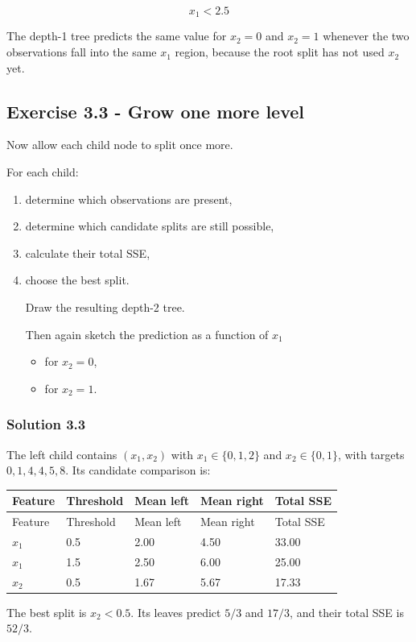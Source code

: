 \documentclass[10pt]{article}
\begin{document}
\[
x_1<2.5
\]

The depth-1 tree predicts the same value for $x_2=0$ and $x_2=1$
whenever the two observations fall into the same $x_1$ region, because
the root split has not used $x_2$ yet.

\par\endgroup

\subsection*{Exercise 3.3 - Grow one more level}
Now allow each child node to split once more.

For each child:

\begin{enumerate}
\item
determine which observations are present,

\item
determine which candidate splits are still possible,

\item
calculate their total SSE,

\item
choose the best split.

Draw the resulting depth-2 tree.

Then again sketch the prediction as a function of $x_1$

\begin{itemize}
\item
for $x_2=0$,

\item
for $x_2=1$.

\end{itemize}
\end{enumerate}
\begingroup\color{red}

\subsubsection*{Solution 3.3}
The left child contains $(x_1,x_2)$ with $x_1\in\{0,1,2\}$ and
$x_2\in\{0,1\}$, with targets $0,1,4,4,5,8$. Its candidate comparison
is:

\begingroup
\small
\setlength{\tabcolsep}{4pt}
\begin{longtable}{l|l|l|l|l}
Feature & Threshold & Mean left & Mean right & Total SSE \\
\hline
\endfirsthead
Feature & Threshold & Mean left & Mean right & Total SSE \\
\hline
\endhead
$x_1$ & 0.5 & 2.00 & 4.50 & 33.00 \\[1.5pt]
$x_1$ & 1.5 & 2.50 & 6.00 & 25.00 \\[1.5pt]
$x_2$ & 0.5 & 1.67 & 5.67 & 17.33 \\[1.5pt]
\end{longtable}
\endgroup
The best split is $x_2<0.5$. Its leaves predict $5/3$ and $17/3$, and
their total SSE is $52/3$.
\end{document}
